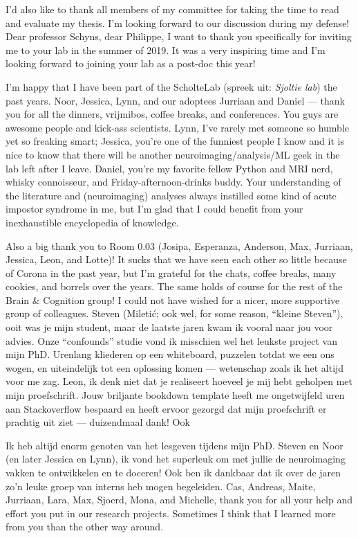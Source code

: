 \documentclass[11pt,american,a4paper,oneside,]{memoir} %
\begin{document}
I'd also like to thank all members of my committee for taking the time to read and evaluate my thesis. I'm looking forward to our discussion during my defense! Dear professor Schyns, dear Philippe, I want to thank you specifically for inviting me to your lab in the summer of 2019. It was a very inspiring time and I'm looking forward to joining your lab as a post-doc this year!

I'm happy that I have been part of the ScholteLab (spreek uit: \emph{Sjoltie lab}) the past years. Noor, Jessica, Lynn, and our adoptees Jurriaan and Daniel --- thank you for all the dinners, vrijmibos, coffee breaks, and conferences. You guys are awesome people and kick-ass scientists. Lynn, I've rarely met someone so humble yet so freaking smart; Jessica, you're one of the funniest people I know and it is nice to know that there will be another neuroimaging/analysis/ML geek in the lab left after I leave. Daniel, you're my favorite fellow Python and MRI nerd, whisky connoisseur, and Friday-afternoon-drinks buddy. Your understanding of the literature and (neuroimaging) analyses always instilled some kind of acute impostor syndrome in me, but I'm glad that I could benefit from your inexhaustible encyclopedia of knowledge.

Also a big thank you to Room 0.03 (Josipa, Esperanza, Anderson, Max, Jurriaan, Jessica, Leon, and Lotte)! It sucks that we have seen each other so little because of Corona in the past year, but I'm grateful for the chats, coffee breaks, many cookies, and borrels over the years. The same holds of course for the rest of the Brain \& Cognition group! I could not have wished for a nicer, more supportive group of colleagues. Steven (Miletić; ook wel, for some reason, ``kleine Steven''), ooit was je mijn student, maar de laatste jaren kwam ik vooral naar jou voor advies. Onze ``confounds'' studie vond ik misschien wel het leukste project van mijn PhD. Urenlang kliederen op een whiteboard, puzzelen totdat we een ons wogen, en uiteindelijk tot een oplossing komen --- wetenschap zoals ik het altijd voor me zag. Leon, ik denk niet dat je realiseert hoeveel je mij hebt geholpen met mijn proefschrift. Jouw briljante bookdown template heeft me ongetwijfeld uren aan Stackoverflow bespaard en heeft ervoor gezorgd dat mijn proefschrift er prachtig uit ziet --- duizendmaal dank! Ook

Ik heb altijd enorm genoten van het lesgeven tijdens mijn PhD. Steven en Noor (en later Jessica en Lynn), ik vond het superleuk om met jullie de neuroimaging vakken te ontwikkelen en te doceren! Ook ben ik dankbaar dat ik over de jaren zo'n leuke groep van interns heb mogen begeleiden. Cas, Andreas, Maite, Jurriaan, Lara, Max, Sjoerd, Mona, and Michelle, thank you for all your help and effort you put in our research projects. Sometimes I think that I learned more from you than the other way around.
\end{document}
